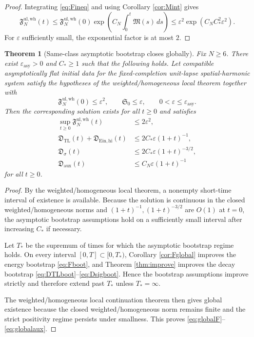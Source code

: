 \documentclass[11pt]{article}
\newtheorem{theorem}{Theorem}
\begin{document}
\begin{proof}
Integrating \eqref{eq:Fineq} and using Corollary \ref{cor:Mint} gives
\[
\mathfrak F_N^{\mathrm{ul,wh}}(t)
\le
\mathfrak F_N^{\mathrm{ul,wh}}(0)
\exp\!\left(C_N\int_0^t \mathfrak M(s)\,ds\right)
\le
\varepsilon^2 \exp(C_NC_\ast^2\varepsilon^2).
\]
For \(\varepsilon\) sufficiently small, the exponential factor is at most \(2\).
\end{proof}

\begin{theorem}[Same-class asymptotic bootstrap closes globally]
\label{thm:global}
Fix \(N\ge 6\). There exist \(\varepsilon_{\mathrm{asy}}>0\) and \(C_\ast\ge 1\) such that the following holds. Let compatible asymptotically flat initial data for the fixed-completion unit-lapse spatial-harmonic system satisfy the hypotheses of the weighted/homogeneous local theorem together with
\begin{equation}
\mathfrak F_N^{\mathrm{ul,wh}}(0)\le \varepsilon^2,
\qquad
\mathfrak S_0\le \varepsilon,
\qquad
0<\varepsilon\le \varepsilon_{\mathrm{asy}}.
\label{eq:smallasy}
\end{equation}
Then the corresponding solution exists for all \(t\ge 0\) and satisfies
\begin{align}
\sup_{t\ge 0}\mathfrak F_N^{\mathrm{ul,wh}}(t)
&\le 2\varepsilon^2,
\label{eq:globalF}
\\
\mathfrak D_{\mathrm{TL}}(t)
+ \mathfrak D_{\mathrm{Ein,hi}}(t)
&\le
2C_\ast\varepsilon(1+t)^{-1},
\label{eq:globalwave}
\\
\mathfrak D_\sigma(t)
&\le
2C_\ast\varepsilon(1+t)^{-3/2},
\label{eq:globalschr}
\\
\mathfrak D_{\mathrm{aux}}(t)
&\le
C_N\varepsilon(1+t)^{-1}
\label{eq:globalaux}
\end{align}
for all \(t\ge 0\).
\end{theorem}

\begin{proof}
By the weighted/homogeneous local theorem, a nonempty short-time interval of existence is available. Because the solution is continuous in the closed weighted/homogeneous norms and \((1+t)^{-1},(1+t)^{-3/2}\) are \(O(1)\) at \(t=0\), the asymptotic bootstrap assumptions hold on a sufficiently small interval after increasing \(C_\ast\) if necessary.

Let \(T_\ast\) be the supremum of times for which the asymptotic bootstrap regime holds. On every interval \([0,T]\subset [0,T_\ast)\), Corollary \ref{cor:Fglobal} improves the energy bootstrap \eqref{eq:Fboot}, and Theorem \ref{thm:improve} improves the decay bootstrap \eqref{eq:DTLboot}--\eqref{eq:Dsigboot}. Hence the bootstrap assumptions improve strictly and therefore extend past \(T_\ast\) unless \(T_\ast=\infty\).

The weighted/homogeneous local continuation theorem then gives global existence because the closed weighted/homogeneous norm remains finite and the strict positivity regime persists under smallness. This proves \eqref{eq:globalF}--\eqref{eq:globalaux}.
\end{proof}
\end{document}
